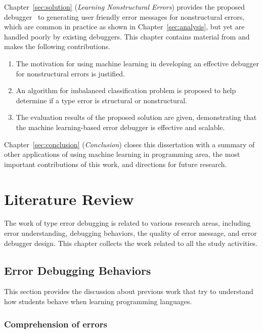 \documentclass[12pt]{report}	%
\begin{document}
Chapter~\ref{sec:solution} (\emph{Learning Nonstructural Errors}) provides the proposed debugger \newCompiler\ 
to generating user friendly error messages for nonstructural errors,
which are common in practice as shown in Chapter~\ref{sec:analysis}, but yet are handled poorly by existing debuggers.
This chapter contains material from \cite{wu2017learning} and makes the following contributions.

\begin{enumerate}
\item The motivation for using machine learning in developing an effective debugger for nonstructural errors is justified.

\item An algorithm for imbalanced classification problem is proposed to help determine if a type error is structural or nonstructural.

\item The evaluation results of the proposed solution are given, demonstrating that the machine learning-based error debugger is effective and scalable.
\end{enumerate}

Chapter~\ref{sec:conclusion} (\emph{Conclusion}) closes this dissertation with a summary of other applications of using machine learning in programming area,
the most important contributions of this work, and directions for future research.

\chapter{Literature Review}
\label{sec:review}

The work of type error debugging is related to various research areas, including
error understanding, debugging behaviors, the quality of error message,
and error debugger design.
This chapter collects the work related to all the study activities.

\section{Error Debugging Behaviors}
\label{sec:review:behavior}

This section provides the discussion about previous work that try to understand how students behave when learning programming languages.

\subsection{Comprehension of errors}
\end{document}
